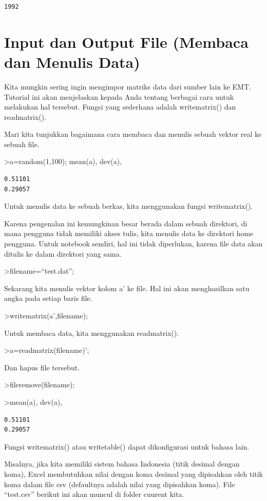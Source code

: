 \documentclass[
]{book}
\begin{document}
\begin{verbatim}
1992
\end{verbatim}

\chapter{Input dan Output File (Membaca dan Menulis Data)}\label{input-dan-output-file-membaca-dan-menulis-data}

Kita mungkin sering ingin mengimpor matriks data dari sumber lain ke EMT. Tutorial ini akan menjelaskan kepada Anda tentang berbagai cara untuk melakukan hal tersebut. Fungsi yang sederhana adalah writematrix() dan readmatrix().

Mari kita tunjukkan bagaimana cara membaca dan menulis sebuah vektor real ke sebuah file.

\textgreater a=random(1,100); mean(a), dev(a),

\begin{verbatim}
0.51101
0.29057
\end{verbatim}

Untuk menulis data ke sebuah berkas, kita menggunakan fungsi writematrix().

Karena pengenalan ini kemungkinan besar berada dalam sebuah direktori, di mana pengguna tidak memiliki akses tulis, kita menulis data ke direktori home pengguna. Untuk notebook sendiri, hal ini tidak diperlukan, karena file data akan ditulis ke dalam direktori yang sama.

\textgreater filename=``test.dat'';

Sekarang kita menulis vektor kolom a' ke file. Hal ini akan menghasilkan satu angka pada setiap baris file.

\textgreater writematrix(a',filename);

Untuk membaca data, kita menggunakan readmatrix().

\textgreater a=readmatrix(filename)';

Dan hapus file tersebut.

\textgreater fileremove(filename);

\textgreater mean(a), dev(a),

\begin{verbatim}
0.51101
0.29057
\end{verbatim}

Fungsi writematrix() atau writetable() dapat dikonfigurasi untuk bahasa lain.

Misalnya, jika kita memiliki sistem bahasa Indonesia (titik desimal dengan koma), Excel membutuhkan nilai dengan koma desimal yang dipisahkan oleh titik koma dalam file csv (defaultnya adalah nilai yang dipisahkan koma). File ``test.csv'' berikut ini akan muncul di folder cuurent kita.
\end{document}
